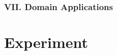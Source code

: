 \documentclass[11pt,twoside]{book}
\begin{document}
\section*{VII. Domain Applications}

\part{Experiment}




\backmatter
\printbibliography[title={References}]
\end{document}
